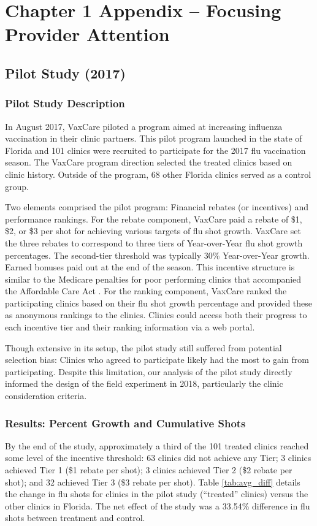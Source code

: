 \chapter{Chapter 1 Appendix -- Focusing Provider Attention}

\section{Pilot Study (2017)}
\subsection{Pilot Study Description}
In August 2017, VaxCare piloted a program aimed at increasing influenza vaccination in their clinic partners. This pilot program launched in the state of Florida and 101 clinics were recruited to participate for the 2017 flu vaccination season. The VaxCare program direction selected the treated clinics based on clinic history. Outside of the program, 68 other Florida clinics served as a control group. 

Two elements comprised the pilot program: Financial rebates (or incentives) and performance rankings. For the rebate component, VaxCare paid a rebate of \$1, \$2, or \$3 per shot for achieving various targets of flu shot growth. VaxCare set the three rebates to correspond to three tiers of Year-over-Year flu shot growth percentages. The second-tier threshold was typically 30\% Year-over-Year growth. Earned bonuses paid out at the end of the season. This incentive structure is similar to the Medicare penalties for poor performing clinics that accompanied the Affordable Care Act \citep[see][for discussion]{Zhang2016}. For the ranking component, VaxCare ranked the participating clinics based on their flu shot growth percentage and provided these as anonymous rankings to the clinics. Clinics could access both their progress to each incentive tier and their ranking information via a web portal.

Though extensive in its setup, the pilot study still suffered from potential selection bias: Clinics who agreed to participate likely had the most to gain from participating. Despite this limitation, our analysis of the pilot study directly informed the design of the field experiment in 2018, particularly the clinic consideration criteria. 

\subsection{Results: Percent Growth and Cumulative Shots}
By the end of the study, approximately a third of the 101 treated clinics reached some level of the incentive threshold: 63 clinics did not achieve any Tier; 3 clinics achieved Tier 1 (\$1 rebate per shot); 3 clinics achieved Tier 2 (\$2 rebate per shot); and 32 achieved Tier 3 (\$3 rebate per shot). Table \ref{tab:avg_diff} details the change in flu shots for clinics in the pilot study (“treated” clinics) versus the other clinics in Florida. The net effect of the study was a 33.54\% difference in flu shots between treatment and control. 

